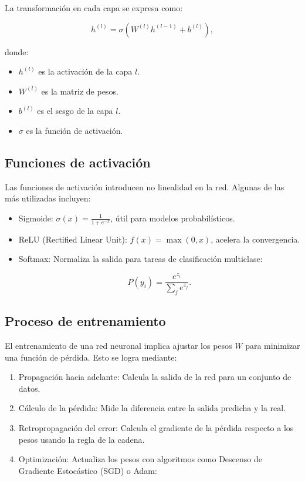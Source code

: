 \begin{itemize}
		La transformación en cada capa se expresa como:
		
		\begin{equation}
			h^{(l)} = \sigma(W^{(l)} h^{(l-1)} + b^{(l)}),
		\end{equation}
		
		donde:
		\begin{itemize}
			\item \( h^{(l)} \) es la activación de la capa \( l \).
			\item \( W^{(l)} \) es la matriz de pesos.
			\item \( b^{(l)} \) es el sesgo de la capa \( l \).
			\item \( \sigma \) es la función de activación.
		\end{itemize}
		
		\subsection{Funciones de activación}
		
		Las funciones de activación introducen no linealidad en la red. Algunas de las más utilizadas incluyen:
		
		\begin{itemize}
			\item Sigmoide: \( \sigma(x) = \frac{1}{1 + e^{-x}} \), útil para modelos probabilísticos.
			\item ReLU (Rectified Linear Unit): \( f(x) = \max(0, x) \), acelera la convergencia.
			\item Softmax: Normaliza la salida para tareas de clasificación multiclase:
			
			\begin{equation}
				P(y_i) = \frac{e^{z_i}}{\sum_{j} e^{z_j}}.
			\end{equation}
		\end{itemize}
		
		\subsection{Proceso de entrenamiento}
		
		El entrenamiento de una red neuronal implica ajustar los pesos \( W \) para minimizar una función de pérdida. Esto se logra mediante:
		
		\begin{enumerate}
			\item Propagación hacia adelante: Calcula la salida de la red para un conjunto de datos.
			\item Cálculo de la pérdida: Mide la diferencia entre la salida predicha y la real.
			\item Retropropagación del error: Calcula el gradiente de la pérdida respecto a los pesos usando la regla de la cadena.
			\item Optimización: Actualiza los pesos con algoritmos como Descenso de Gradiente Estocástico (SGD) o Adam:
			

\end{enumerate}
\end{itemize}
